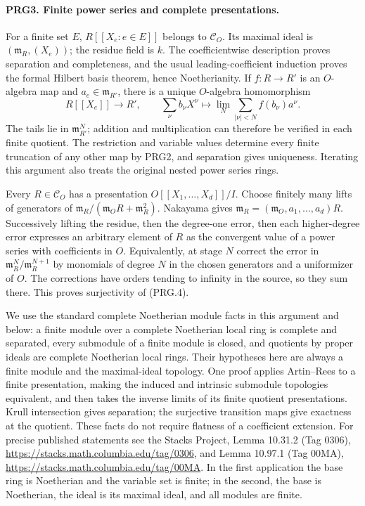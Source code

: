 \paragraph{PRG3. Finite power series and complete presentations.}
\label{claim:PRG3}
For a finite set \(E\), \(R[[X_e:e\in E]]\) belongs to
\(\mathcal C_O\). Its maximal ideal is
\((\mathfrak m_R,(X_e))\); the residue field is \(k\).
The coefficientwise description proves separation and completeness,
and the usual leading-coefficient induction proves the formal
Hilbert basis theorem, hence Noetherianity. If \(f:R\to R'\) is an
\(O\)-algebra map and \(a_e\in\mathfrak m_{R'}\), there is a
unique \(O\)-algebra homomorphism
\[
 R[[X_e]]\longrightarrow R',\qquad
 \sum_\nu b_\nu X^\nu\longmapsto
 \lim_{N}\sum_{|\nu|<N} f(b_\nu)a^\nu.                    \tag{PRG.4}
\]
The tails lie in \(\mathfrak m_{R'}^N\); addition and multiplication
can therefore be verified in each finite quotient. The restriction
and variable values determine every finite truncation of any other
map by PRG2, and separation gives uniqueness. Iterating this argument
also treats the original nested power series rings.

Every \(R\in\mathcal C_O\) has a presentation
\(O[[X_1,\ldots,X_d]]/I\). Choose finitely many lifts of generators
of \(\mathfrak m_R/(\mathfrak m_OR+\mathfrak m_R^2)\).
Nakayama gives \(\mathfrak m_R=(\mathfrak m_O,a_1,\ldots,a_d)R\).
Successively lifting the residue, then the degree-one error, then
each higher-degree error expresses an arbitrary element of \(R\)
as the convergent value of a power series with coefficients in \(O\).
Equivalently, at stage \(N\) correct the error in
\(\mathfrak m_R^N/\mathfrak m_R^{N+1}\) by monomials of degree
\(N\) in the chosen generators and a uniformizer of \(O\).
The corrections have orders tending to infinity in the source, so
they sum there. This proves surjectivity of (PRG.4).

We use the standard complete Noetherian module facts in this
argument and below: a finite module over a complete Noetherian local
ring is complete and separated, every submodule of a finite module
is closed, and quotients by proper ideals are complete Noetherian
local rings. Their hypotheses here are always a finite module and
the maximal-ideal topology. One proof applies Artin--Rees to a
finite presentation, making the induced and intrinsic submodule
topologies equivalent, and then takes the inverse limits of its
finite quotient presentations. Krull intersection gives separation;
the surjective transition maps give exactness at the quotient.
These facts do not require flatness of a coefficient extension.
For precise published statements see the Stacks Project,
Lemma 10.31.2 (Tag 0306), \url{https://stacks.math.columbia.edu/tag/0306},
and Lemma 10.97.1 (Tag 00MA),
\url{https://stacks.math.columbia.edu/tag/00MA}.
In the first application the base ring is Noetherian and the
variable set is finite; in the second, the base is Noetherian,
the ideal is its maximal ideal, and all modules are finite.

